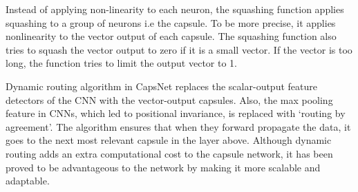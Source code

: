 Instead of applying non-linearity to each neuron, the squashing function applies squashing to a group of neurons i.e the capsule. To be more precise, it applies nonlinearity to the vector output of each capsule. The squashing function also tries to squash the vector output to zero if it is a small vector. If the vector is too long, the function tries to limit the output vector to 1.\par\bigskip
Dynamic routing algorithm in CapsNet replaces the scalar-output feature detectors of the CNN with the vector-output capsules. Also, the max pooling feature in CNNs, which led to positional invariance, is replaced with ‘routing by agreement’. The algorithm ensures that when they forward propagate the data, it goes to the next most relevant capsule in the layer above. Although dynamic routing adds an extra computational cost to the capsule network, it has been proved to be advantageous to the network by making it more scalable and adaptable.
